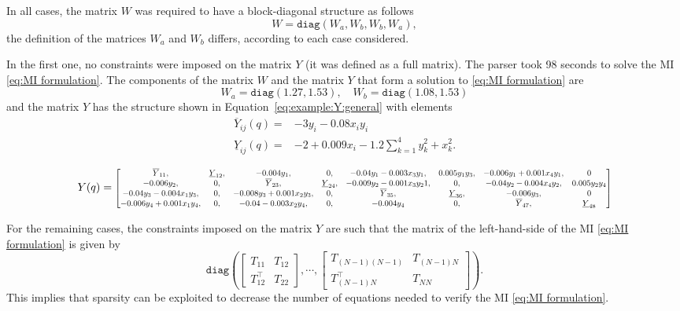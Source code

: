 \documentclass[10pt,twocolumn,twoside]{IEEEtran}
\theoremstyle{plain}
\theoremstyle{definition}
\theoremstyle{remark}
\begin{document}
In all cases, the matrix $W$ was required to have a block-diagonal structure as follows
\begin{equation*}
 W=\mathbin{\mathtt{diag}}\left(W_a,W_b,W_b,W_a\right),
\end{equation*}
the definition of the matrices $W_a$ and $W_b$ differs, according to each case considered.

In the first one, no constraints were imposed on the matrix $Y$ (it was defined as a full matrix). The parser took 98  seconds to solve the MI \eqref{eq:MI formulation}. The components of the matrix $W$ and the matrix $Y$ that form a solution to \eqref{eq:MI formulation} are
\begin{equation*}
		W_a=\mathbin{\mathtt{diag}}\left(
 1.27,1.53\right),\quad W_b=\mathbin{\mathtt{diag}}\left(1.08,1.53\right)
\end{equation*}
and the matrix $Y$ has the structure shown in Equation~\eqref{eq:example:Y:general} with elements
\begin{align*}
 \overline{Y}_{ij}(q)=&-3y_i-0.08x_iy_i\\
 \underline{Y}_{ij}(q)=&-2+0.009x_i-1.2\sum_{k=1}^4 y_k^2+x_k^2.
\end{align*}

\begin{figure}
\begin{equation}\label{eq:example:Y:general}
		Y(q)=\scalebox{0.75}{$\begin{bmatrix}
			\overline{Y}_{11},&\underline{Y}_{12},&-0.004y_1,&0,&-0.04y_1-0.003x_3y_1,&0.005y_1y_3,&-0.006y_1+0.001x_4y_1,&0\\
			-0.006y_2,&0,&\overline{Y}_{23},&\underline{Y}_{24},&-0.009y_2-0.001x_3y_21,&0,&-0.04y_2-0.004x_4y_2,&0.005y_2y_4\\
			-0.04y_3-0.004x_1y_3,&0,&-0.008y_3+0.001x_2y_3,&0,&\overline{Y}_{35},&\underline{Y}_{36},&-0.006y_3,&0\\
			-0.006y_4+0.001x_1y_4,&0,&-0.04-0.003x_2y_4,&0,&-0.004y_4&0,&\overline{Y}_{47},&\underline{Y}_{48}
		\end{bmatrix}$}
\end{equation}
\end{figure}

For the remaining cases, the constraints imposed on the matrix $Y$ are such that the matrix of the left-hand-side of the MI \eqref{eq:MI formulation} is given by
\begin{equation*}
	\mathbin{\mathtt{diag}}\left(\begin{bmatrix}
		T_{11}&T_{12}\\
		T_{12}^\top&T_{22}
	\end{bmatrix},\cdots,\begin{bmatrix}
		T_{(N-1)(N-1)}&T_{(N-1)N}\\
		T_{(N-1)N}^\top&T_{NN}
	\end{bmatrix}\right).
\end{equation*}
This implies that sparsity can be exploited to decrease the number of equations needed to verify the MI \eqref{eq:MI formulation}.
\end{document}
